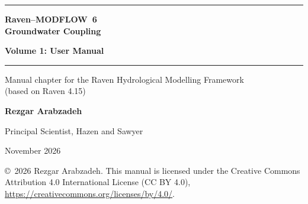 \documentclass[11pt,a4paper]{report}
\begin{document}
\begin{titlepage}
\centering
\vspace*{3.5cm}
{\color{brand}\rule{\linewidth}{1.2pt}}\par\vspace{16pt}
{\sffamily\bfseries\fontsize{30}{38}\selectfont\color{brand}Raven--MODFLOW~6\\[4pt]Groundwater Coupling\par}
\vspace{10pt}
{\sffamily\bfseries\LARGE\color{brand}Volume 1: User Manual\par}
\vspace{14pt}
{\color{brand}\rule{\linewidth}{1.2pt}}\par\vspace{24pt}
{\large Manual chapter for the Raven Hydrological Modelling Framework\\[2pt](based on Raven 4.15)\par}
\vfill
{\sffamily\Large\bfseries Rezgar Arabzadeh\par}
\vspace{4pt}
{\large Principal Scientist, Hazen and Sawyer\par}
\vspace{2cm}
{\large November 2026\par}
\vspace{1.2cm}
{\footnotesize\color{gray!70!black}\copyright\ 2026 Rezgar Arabzadeh. This manual is licensed under the Creative Commons Attribution 4.0
International License (CC BY 4.0), \url{https://creativecommons.org/licenses/by/4.0/}.\par}
\end{titlepage}
\begingroup\small\tableofcontents\endgroup
\cleardoublepage
{}









\appendix

\cleardoublepage{}


\end{document}
